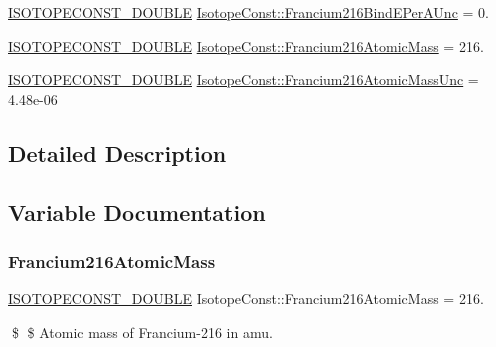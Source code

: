 \begin{DoxyCompactItemize}
\mbox{\hyperlink{group___isotope_const-_macros_ga8f45a7272ce02c0b4c65c44636ed719a}{I\+S\+O\+T\+O\+P\+E\+C\+O\+N\+S\+T\+\_\+\+D\+O\+U\+B\+LE}} \mbox{\hyperlink{group___isotope_const-_francium-_fr216_gaf406e5d9bdac70c79e883a6689fee098}{Isotope\+Const\+::\+Francium216\+Bind\+E\+Per\+A\+Unc}} = 0.
\item 
\mbox{\hyperlink{group___isotope_const-_macros_ga8f45a7272ce02c0b4c65c44636ed719a}{I\+S\+O\+T\+O\+P\+E\+C\+O\+N\+S\+T\+\_\+\+D\+O\+U\+B\+LE}} \mbox{\hyperlink{group___isotope_const-_francium-_fr216_ga43e121609f2aa1d558765a4460d36e4e}{Isotope\+Const\+::\+Francium216\+Atomic\+Mass}} = 216.
\item 
\mbox{\hyperlink{group___isotope_const-_macros_ga8f45a7272ce02c0b4c65c44636ed719a}{I\+S\+O\+T\+O\+P\+E\+C\+O\+N\+S\+T\+\_\+\+D\+O\+U\+B\+LE}} \mbox{\hyperlink{group___isotope_const-_francium-_fr216_gab166eeddc7fcd34273a9e28c8176f1e9}{Isotope\+Const\+::\+Francium216\+Atomic\+Mass\+Unc}} = 4.\+48e-\/06
\end{DoxyCompactItemize}


\subsection{Detailed Description}


\subsection{Variable Documentation}
\mbox{\label{group___isotope_const-_francium-_fr216_ga43e121609f2aa1d558765a4460d36e4e}} 
\subsubsection{\texorpdfstring{Francium216\+Atomic\+Mass}{Francium216AtomicMass}}
{\footnotesize\ttfamily \mbox{\hyperlink{group___isotope_const-_macros_ga8f45a7272ce02c0b4c65c44636ed719a}{I\+S\+O\+T\+O\+P\+E\+C\+O\+N\+S\+T\+\_\+\+D\+O\+U\+B\+LE}} Isotope\+Const\+::\+Francium216\+Atomic\+Mass = 216.}

\$ \$ Atomic mass of Francium-\/216 in amu. \mbox{\label{group___isotope_const-_francium-_fr216_gab166eeddc7fcd34273a9e28c8176f1e9}} 
